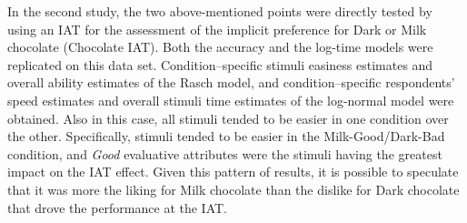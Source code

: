 \documentclass[12pt]{book}
\begin{document}

In the second study, the two above-mentioned points were directly tested by using an IAT for the assessment of the implicit preference for Dark or Milk chocolate (Chocolate IAT). 
Both the accuracy and the log-time models were replicated on this data set. 
Condition--specific stimuli easiness estimates and overall ability estimates of the Rasch model, and condition--specific respondents' speed estimates and overall stimuli time estimates of the log-normal model were obtained. 
Also in this case, all stimuli tended to be easier in one condition over the other. 
Specifically, stimuli tended to be easier in the Milk-Good/Dark-Bad condition, and \emph{Good} evaluative attributes were the stimuli having the greatest impact on the IAT effect. 
Given this pattern of results, it is possible to speculate that it was more the liking for Milk chocolate than the dislike for Dark chocolate that drove the performance at the IAT. 
\end{document}
